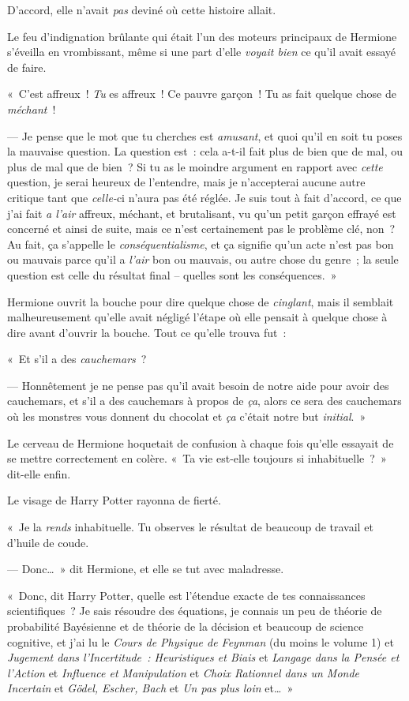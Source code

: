 D'accord, elle n'avait \emph{pas} deviné où cette histoire allait.

Le feu d'indignation brûlante qui était l'un des moteurs principaux de Hermione s'éveilla en vrombissant, même si une part d'elle \emph{voyait bien} ce qu'il avait essayé de faire.

«~C'est affreux~! \emph{Tu} es affreux~! Ce pauvre garçon~! Tu as fait quelque chose de \emph{méchant}~!

--- Je pense que le mot que tu cherches est \emph{amusant}, et quoi qu'il en soit tu poses la mauvaise question. La question est~: cela a-t-il fait plus de bien que de mal, ou plus de mal que de bien~? Si tu as le moindre argument en rapport avec \emph{cette} question, je serai heureux de l'entendre, mais je n'accepterai aucune autre critique tant que \emph{celle-}ci n'aura pas été réglée. Je suis tout à fait d'accord, ce que j'ai fait \emph{a l'air} affreux, méchant, et brutalisant, vu qu'un petit garçon effrayé est concerné et ainsi de suite, mais ce n'est certainement pas le problème clé, non~? Au fait, ça s'appelle le \emph{conséquentialisme}, et ça signifie qu'un acte n'est pas bon ou mauvais parce qu'il a \emph{l'air} bon ou mauvais, ou autre chose du genre~; la seule question est celle du résultat final -- quelles sont les conséquences.~»

Hermione ouvrit la bouche pour dire quelque chose de \emph{cinglant}, mais il semblait malheureusement qu'elle avait négligé l'étape où elle pensait à quelque chose à dire avant d'ouvrir la bouche. Tout ce qu'elle trouva fut~:

«~Et s'il a des \emph{cauchemars}~?

--- Honnêtement je ne pense pas qu'il avait besoin de notre aide pour avoir des cauchemars, et s'il a des cauchemars à propos de \emph{ça}, alors ce sera des cauchemars où les monstres vous donnent du chocolat et \emph{ça} c'était notre but \emph{initial}.~»

Le cerveau de Hermione hoquetait de confusion à chaque fois qu'elle essayait de se mettre correctement en colère. «~Ta vie est-elle toujours si inhabituelle~?~» dit-elle enfin.

Le visage de Harry Potter rayonna de fierté.

«~Je la \emph{rends} inhabituelle. Tu observes le résultat de beaucoup de travail et d'huile de coude.

--- Donc…~» dit Hermione, et elle se tut avec maladresse.

«~Donc, dit Harry Potter, quelle est l'étendue exacte de tes connaissances scientifiques~? Je sais résoudre des équations, je connais un peu de théorie de probabilité Bayésienne et de théorie de la décision et beaucoup de science cognitive, et j'ai lu le \emph{Cours de Physique de Feynman} (du moins le volume 1) et \emph{Jugement dans l'Incertitude~: Heuristiques et Biais} et \emph{Langage dans la Pensée et l'Action} et \emph{Influence et Manipulation} et \emph{Choix Rationnel dans un Monde Incertain} et \emph{Gödel, Escher, Bach} et \emph{Un pas plus loin} et…~»

